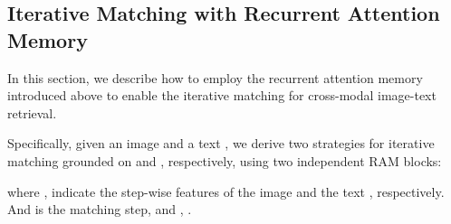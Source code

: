 \documentclass[10pt,twocolumn,letterpaper]{article}
\begin{document}
\begin{table*}[t!]
\centering
\caption{Comparison with the state-of-the-art models on Flickr8K. As results of SCAN~\cite{lee2018stacked} are not reported on Flickr8K, here we show our experiment results by running codes provided by authors.}
\label{tab:flickr8k}
\end{table*}

\subsection{Iterative Matching with Recurrent Attention Memory}
\label{sec:iter_ram}
In this section, we describe how to employ the recurrent attention memory introduced above to enable the iterative matching for cross-modal image-text retrieval.

Specifically, given an image  and a text , we derive two strategies for iterative matching grounded on  and , respectively, using two independent RAM blocks:

where ,  indicate the step-wise features of the image  and the text , respectively. And  is the matching step, and , .
\end{document}
